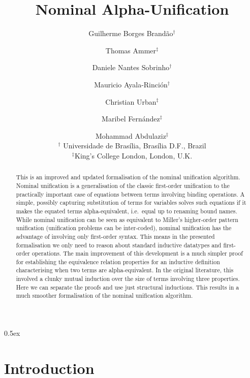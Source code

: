 \documentclass[11pt,a4paper]{article}
\begin{document}
\title{Nominal Alpha-Unification}
\author{Guilherme Borges Brand\~ao$^\dag$ \and Thomas Ammer$^\ddag$ \and Daniele Nantes Sobrinho$^\dag$ \and Mauricio Ayala-Rinci\'on$^\dag$ \and  Christian Urban$^\ddag$ \and Maribel Fern\'andez$^\ddag$ \and Mohammad Abdulaziz$^\ddag$\\[2mm]
\mbox{}$^\dag$ Universidade de Bras\'ilia, Bras\'ilia D.F., Brazil \\[1mm]
\mbox{}$^\ddag$King's College London, London, U.K.
 }

\maketitle

\begin{abstract}
  \noindent
  This is an improved and updated formalisation of the nominal
  unification algorithm.  Nominal unification is a generalisation of
  the classic first-order unification to the practically important
  case of equations between terms involving binding operations. A
  simple, possibly capturing substitution of terms for variables
  solves such equations if it makes the equated terms
  alpha-equivalent, i.e.~equal up to renaming bound names. While
  nominal unification can be seen as equivalent to Miller's
  higher-order pattern unification (unification problems can be inter-coded),
  nominal unification has the advantage of involving only first-order
  syntax. This means in the presented formalisation we only need to
  reason about standard inductive datatypes and first-order
  operations. The main improvement of this development is a much
  simpler proof for establishing the equivalence relation properties
  for an inductive definition characterising when two terms are
  alpha-equivalent. In the original literature, this involved a clunky
  mutual induction over the size of terms involving three properties. Here 
  we can separate the proofs and use just structural inductions. This
  results in a much smoother formalisation of the nominal
  unification algorithm.

\end{abstract}
\tableofcontents

\parindent 0pt\parskip 0.5ex


\section{Introduction}
\end{document}
